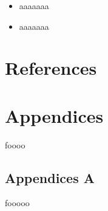 \documentclass[13pt]{ctexart} %
\begin{document}
\begin{itemize}
    \item aaaaaaa
    \item aaaaaaa
\end{itemize}

\newpage
\section*{References}
\fancyhf{}
\fancyhead[R]{ }
\fancyhead[L]{ }

\Large

\newpage

\section*{Appendices}
\fontsize{13pt}{12.5pt}\selectfont
foooo
\vspace{7pt}
\subsection*{Appendices A}
fooooo
\end{document}
